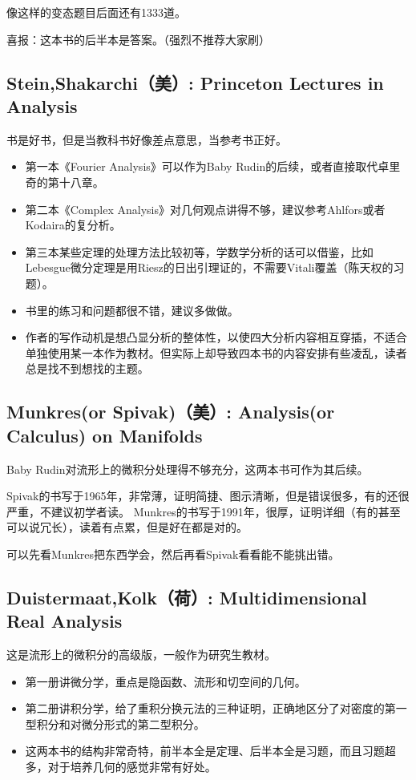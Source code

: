 \documentclass[UTF8]{article}
\begin{document}
    像这样的变态题目后面还有1333道。

    喜报：这本书的后半本是答案。（强烈不推荐大家刷）
    \subsection{Stein,Shakarchi（美）: Princeton Lectures in Analysis}
    书是好书，但是当教科书好像差点意思，当参考书正好。\begin{itemize}
        \item 第一本《Fourier Analysis》可以作为Baby Rudin的后续，或者直接取代卓里奇的第十八章。
        \item 第二本《Complex Analysis》对几何观点讲得不够，建议参考Ahlfors或者Kodaira的复分析。
        \item 第三本某些定理的处理方法比较初等，学数学分析的话可以借鉴，比如Lebesgue微分定理是用Riesz的日出引理证的，不需要Vitali覆盖（陈天权的习题）。
        \item 书里的练习和问题都很不错，建议多做做。
        \item 作者的写作动机是想凸显分析的整体性，以使四大分析内容相互穿插，不适合单独使用某一本作为教材。但实际上却导致四本书的内容安排有些凌乱，读者总是找不到想找的主题。
    \end{itemize}
    \subsection{Munkres(or Spivak)（美）: Analysis(or Calculus) on Manifolds}
    Baby Rudin对流形上的微积分处理得不够充分，这两本书可作为其后续。
    
    Spivak的书写于1965年，非常薄，证明简捷、图示清晰，但是错误很多，有的还很严重，不建议初学者读。
    Munkres的书写于1991年，很厚，证明详细（有的甚至可以说冗长），读着有点累，但是好在都是对的。

    可以先看Munkres把东西学会，然后再看Spivak看看能不能挑出错。
    \subsection{Duistermaat,Kolk（荷）: Multidimensional Real Analysis}
    这是流形上的微积分的高级版，一般作为研究生教材。
    \begin{itemize}
        \item 第一册讲微分学，重点是隐函数、流形和切空间的几何。
        \item 第二册讲积分学，给了重积分换元法的三种证明，正确地区分了对密度的第一型积分和对微分形式的第二型积分。
        \item 这两本书的结构非常奇特，前半本全是定理、后半本全是习题，而且习题超多，对于培养几何的感觉非常有好处。
    \end{itemize}
\end{document}
